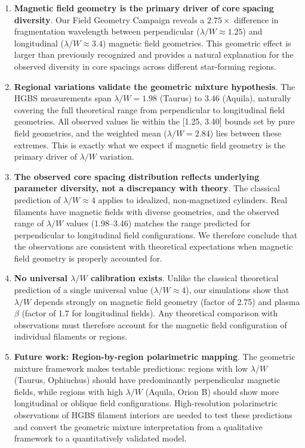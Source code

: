 \documentclass[twoside,twocolumn]{mnras}
\begin{document}
\begin{enumerate}
    \item \textbf{Magnetic field geometry is the primary driver of core spacing diversity}. Our Field Geometry Campaign reveals a $2.75\times$ difference in fragmentation wavelength between perpendicular ($\lambda/W \approx 1.25$) and longitudinal ($\lambda/W \approx 3.4$) magnetic field geometries. This geometric effect is larger than previously recognized and provides a natural explanation for the observed diversity in core spacings across different star-forming regions.

    \item \textbf{Regional variations validate the geometric mixture hypothesis}. The HGBS measurements span $\lambda/W = 1.98$ (Taurus) to $3.46$ (Aquila), naturally covering the full theoretical range from perpendicular to longitudinal field geometries. All observed values lie within the [1.25, 3.40] bounds set by pure field geometries, and the weighted mean ($\lambda/W = 2.84$) lies between these extremes. This is exactly what we expect if magnetic field geometry is the primary driver of $\lambda/W$ variation.

    \item \textbf{The observed core spacing distribution reflects underlying parameter diversity, not a discrepancy with theory}. The classical prediction of $\lambda/W \approx 4$ applies to idealized, non-magnetized cylinders. Real filaments have magnetic fields with diverse geometries, and the observed range of $\lambda/W$ values (1.98--3.46) matches the range predicted for perpendicular to longitudinal field configurations. We therefore conclude that the observations are consistent with theoretical expectations when magnetic field geometry is properly accounted for.

    \item \textbf{No universal $\lambda/W$ calibration exists}. Unlike the classical theoretical prediction of a single universal value ($\lambda/W \approx 4$), our simulations show that $\lambda/W$ depends strongly on magnetic field geometry (factor of 2.75) and plasma $\beta$ (factor of 1.7 for longitudinal fields). Any theoretical comparison with observations must therefore account for the magnetic field configuration of individual filaments or regions.

    \item \textbf{Future work: Region-by-region polarimetric mapping}. The geometric mixture framework makes testable predictions: regions with low $\lambda/W$ (Taurus, Ophiuchus) should have predominantly perpendicular magnetic fields, while regions with high $\lambda/W$ (Aquila, Orion B) should show more longitudinal or oblique field configurations. High-resolution polarimetric observations of HGBS filament interiors are needed to test these predictions and convert the geometric mixture interpretation from a qualitative framework to a quantitatively validated model.
\end{enumerate}
\end{document}
